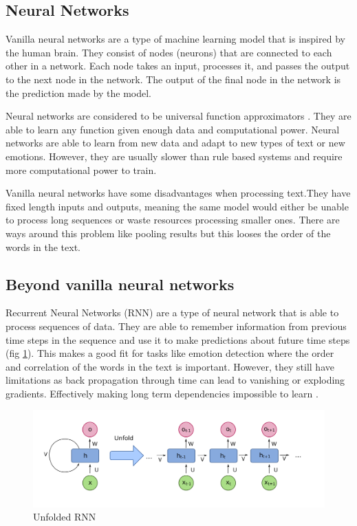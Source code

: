 \subsection{Neural Networks}

Vanilla neural networks are a type of machine learning model that is inspired
by the human brain. They consist of nodes (neurons) that are
connected to each other in a network. Each node takes an input, processes it,
and passes the output to the next node in the network. The output of the final
node in the network is the prediction made by the model.

Neural networks are considered to be universal function approximators
\cite{hornik1989multilayer}. They are able to learn any function given enough
data and computational power. Neural networks are able to
learn from new data and adapt to new types of text or new emotions. However,
they are usually slower than rule based systems and require more computational
power to train.

Vanilla neural networks have some disadvantages when processing text.They have
fixed length inputs and outputs, meaning the same model would either be unable
to process long sequences or waste resources processing smaller ones. There are ways
around this problem like pooling results but this looses the order of the
words in the text.

\subsection{Beyond vanilla neural networks}

Recurrent Neural Networks (RNN) are a type of neural network that is able to
process sequences of data. They are able to remember information from previous
time steps in the sequence and use it to make predictions about future time
steps (fig \ref{fig:unfolded_rnn}). This makes a good fit for tasks like
emotion detection where the order and correlation of the words in the text is
important. However, they still have limitations as back propagation through
time can lead to vanishing or exploding gradients. Effectively making long term
dependencies impossible to learn \cite{hochreiter1997long}.

\begin{figure}[!ht]
    \includegraphics[keepaspectratio,
        width=15cm]{./figures/2048px-Recurrent_neural_network_unfold.png}
    \caption{Unfolded RNN \cite{RNN}}
    \label{fig:unfolded_rnn}

\end{figure}

